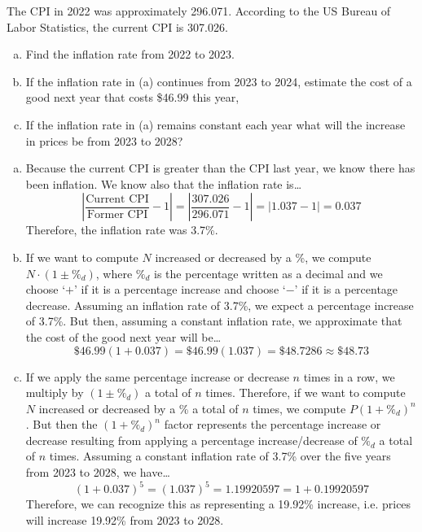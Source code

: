 \documentclass[11pt,letterpaper]{article}
\begin{document}

 The CPI in 2022 was approximately 296.071. According to the US Bureau of Labor Statistics, the current CPI is 307.026.
	\begin{enumerate}[(a)]
	\item Find the inflation rate from 2022 to 2023. 
	\item If the inflation rate in (a) continues from 2023 to 2024, estimate the cost of a good next year that costs \$46.99 this year,
	\item If the inflation rate in (a) remains constant each year what will the increase in prices be from 2023 to 2028? 
	\end{enumerate} \pspace

\sol 
\begin{enumerate}[(a)]
\item Because the current CPI is greater than the CPI last year, we know there has been inflation. We know also that the inflation rate is\dots
	\[
	\left| \dfrac{\text{Current CPI}}{\text{Former CPI}} - 1 \right|= \left| \dfrac{307.026}{296.071} - 1 \right|= |1.037 - 1|= 0.037
	\]
Therefore, the inflation rate was 3.7\%. \pspace

\item If we want to compute $N$ increased or decreased by a \%, we compute $N \cdot (1 \pm \%_d)$, where $\%_d$ is the percentage written as a decimal and we choose `$+$' if it is a percentage increase and choose `$-$' if it is a percentage decrease. Assuming an inflation rate of 3.7\%, we expect a percentage increase of 3.7\%. But then, assuming a constant inflation rate, we approximate that the cost of the good next year will be\dots
	\[
	\$46.99 (1 + 0.037)= \$46.99 (1.037)= \$48.7286 \approx \$48.73
	\] \pspace

\item If we apply the same percentage increase or decrease $n$ times in a row, we multiply by $(1 \pm \%_d)$ a total of $n$ times. Therefore, if we want to compute $N$ increased or decreased by a \% a total of $n$ times, we compute $P(1 + \%_d)^n$. But then the $(1 + \%_d)^n$ factor represents the percentage increase or decrease resulting from applying a percentage increase/decrease of $\%_d$ a total of $n$ times. Assuming a constant inflation rate of 3.7\% over the five years from 2023 to 2028, we have\dots
	\[
	(1 + 0.037)^5= (1.037)^5= 1.19920597= 1 + 0.19920597
	\]
Therefore, we can recognize this as representing a 19.92\% increase, i.e. prices will increase 19.92\% from 2023 to 2028. 
\end{enumerate}
\end{document}
